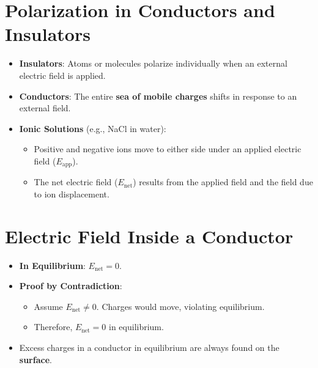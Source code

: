 \documentclass{article}
\begin{document}
\section*{Polarization in Conductors and Insulators}
\begin{itemize}
    \item \textbf{Insulators}: Atoms or molecules polarize individually when an external electric field is applied.
    \item \textbf{Conductors}: The entire \textbf{sea of mobile charges} shifts in response to an external field.
    \item \textbf{Ionic Solutions} (e.g., NaCl in water):
    \begin{itemize}
        \item Positive and negative ions move to either side under an applied electric field (\(E_{\text{app}}\)).
        \item The net electric field (\(E_{\text{net}}\)) results from the applied field and the field due to ion displacement.
    \end{itemize}
\end{itemize}

\section*{Electric Field Inside a Conductor}
\begin{itemize}
    \item \textbf{In Equilibrium}: \(E_{\text{net}} = 0\).
    \item \textbf{Proof by Contradiction}:
    \begin{itemize}
        \item Assume \(E_{\text{net}} \neq 0\). Charges would move, violating equilibrium.
        \item Therefore, \(E_{\text{net}} = 0\) in equilibrium.
    \end{itemize}
    \item Excess charges in a conductor in equilibrium are always found on the \textbf{surface}.
\end{itemize}
\end{document}
